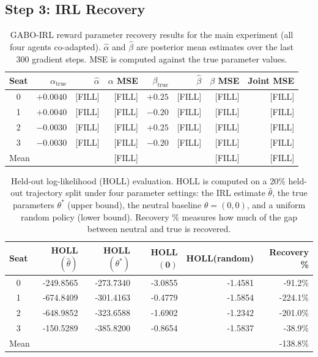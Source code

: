 \documentclass{article}
\begin{document}
\subsection{Step 3: IRL Recovery}

\begin{table}[t]
\caption{GABO-IRL reward parameter recovery results for the main experiment (all four agents co-adapted). $\hat\alpha$ and $\hat\beta$ are posterior mean estimates over the last 300 gradient steps. MSE is computed against the true parameter values.}
\label{tab:irl_results}
\centering
\begin{tabular}{crrrrrrr}
\toprule
Seat & $\alpha_{\text{true}}$ & $\hat\alpha$ & $\alpha$ MSE & $\beta_{\text{true}}$ & $\hat\beta$ & $\beta$ MSE & Joint MSE \\
\midrule
0 & $+0.0040$ & \hphantom{$-$}[FILL] & [FILL] & $+0.25$ & \hphantom{$-$}[FILL] & [FILL] & [FILL] \\
1 & $+0.0040$ & \hphantom{$-$}[FILL] & [FILL] & $-0.20$ & \hphantom{$-$}[FILL] & [FILL] & [FILL] \\
2 & $-0.0030$ & \hphantom{$-$}[FILL] & [FILL] & $+0.25$ & \hphantom{$-$}[FILL] & [FILL] & [FILL] \\
3 & $-0.0030$ & \hphantom{$-$}[FILL] & [FILL] & $-0.20$ & \hphantom{$-$}[FILL] & [FILL] & [FILL] \\
\midrule
\multicolumn{3}{l}{Mean} & [FILL] & & & [FILL] & [FILL] \\
\bottomrule
\end{tabular}
\end{table}

\begin{table}[t]
\caption{Held-out log-likelihood (HOLL) evaluation. HOLL is computed on a 20\% held-out trajectory split under four parameter settings: the IRL estimate $\hat\theta$, the true parameters $\theta^*$ (upper bound), the neutral baseline $\theta = (0,0)$, and a uniform random policy (lower bound). Recovery \% measures how much of the gap between neutral and true is recovered.}
\label{tab:holl}
\centering
\begin{tabular}{crrrrr}
\toprule
Seat & HOLL$(\hat\theta)$ & HOLL$(\theta^*)$ & HOLL$(\mathbf{0})$ & HOLL(random) & Recovery \% \\
\midrule
0 & -249.8565 & -273.7340 & -3.0855 & -1.4581 & -91.2\% \\
1 & -674.8409 & -301.4163 & -0.4779 & -1.5854 & -224.1\% \\
2 & -648.9852 & -323.6588 & -1.6902 & -1.2342 & -201.0\% \\
3 & -150.5289 & -385.8200 & -0.8654 & -1.5837 & -38.9\% \\
\midrule
\multicolumn{5}{l}{Mean} & -138.8\% \\
\bottomrule
\end{tabular}
\end{table}
\end{document}
